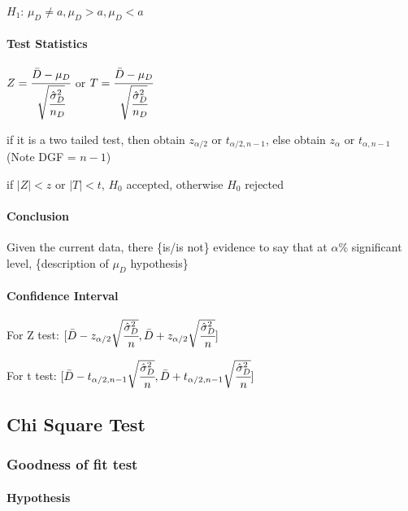 \documentclass[]{article}
\let\oldparagraph\paragraph
\renewcommand{\paragraph}[1]{\oldparagraph{#1}\mbox{}}
\begin{document}
\(H_1\): \(\mu_D \ne a, \mu_D > a, \mu_D < a\)

\paragraph{Test Statistics}\label{header-n229}

\(Z = \cfrac{\bar{D} - \mu_D}{\sqrt{\cfrac{\hat{\sigma}^2_D}{n_D}}}\) or
\(T = \cfrac{\bar{D} - \mu_D}{\sqrt{\cfrac{\hat{\sigma}^2_D}{n_D}}}\)

if it is a two tailed test, then obtain \(z_{\alpha/2}\) or
\(t_{\alpha/2 , n-1}\), else obtain \(z_{\alpha}\) or
\(t_{\alpha, n-1}\)(Note DGF = \(n - 1\))

if \(|Z| < z\) or \(|T| < t\), \(H_0\) accepted, otherwise \(H_0\)
rejected

\paragraph{Conclusion}\label{header-n233}

Given the current data, there \{is/is not\} evidence to say that at
\(\alpha\)\% significant level, \{description of \(\mu_D\) hypothesis\}

\paragraph{Confidence Interval}\label{header-n235}

For Z test:
\([\bar{D} - z_{\alpha/2}\sqrt{\cfrac{\hat{\sigma}^2_D}{n}},\bar{D} + z_{\alpha/2}\sqrt{\cfrac{\hat{\sigma}^2_D}{n}}]\)

For t test:
\([\bar{D} - t_{\alpha/2,n-1}\sqrt{\cfrac{\hat{\sigma}^2_D}{n}},\bar{D} + t_{\alpha/2,n-1}\sqrt{\cfrac{\hat{\sigma}^2_D}{n}}]\)

\subsection{Chi Square Test}\label{header-n238}

\subsubsection{Goodness of fit test}\label{header-n239}

\paragraph{Hypothesis}\label{header-n240}
\end{document}
